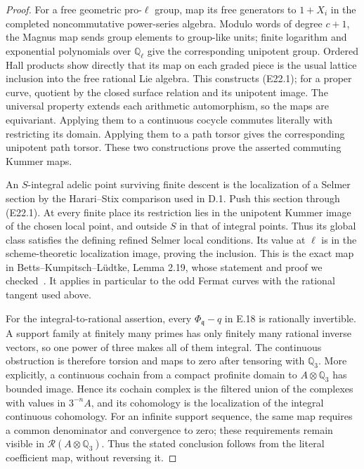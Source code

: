 \documentclass[11pt,oneside]{article}
\begin{document}
\begin{proof}
For a free geometric pro-$\ell$ group, map
its free generators to $1+X_i$ in the
completed noncommutative power-series
algebra. Modulo words of degree $c+1$,
the Magnus map sends group elements to
group-like units; finite logarithm and
exponential polynomials over $\mathbb Q_\ell$
give the corresponding unipotent group.
Ordered Hall products show directly
that its map on each graded piece is
the usual lattice inclusion into the
free rational Lie algebra. This
constructs (E22.1); for a proper curve,
quotient by the closed surface relation
and its unipotent image. The universal
property extends each arithmetic
automorphism, so the maps are equivariant.
Applying them to a continuous cocycle
commutes literally with restricting
its domain. Applying them to a path
torsor gives the corresponding
unipotent path torsor. These two
constructions prove the asserted
commuting Kummer maps.

An $S$-integral adelic point surviving
finite descent is the localization of
a Selmer section by the Harari--Stix
comparison used in D.1. Push this
section through (E22.1). At every finite
place its restriction lies in the
unipotent Kummer image of the chosen
local point, and outside $S$ in that
of integral points. Thus its global
class satisfies the defining refined
Selmer local conditions. Its value
at $\ell$ is in the scheme-theoretic
localization image, proving the
inclusion. This is the exact map
in Betts--Kumpitsch--L\"udtke,
Lemma 2.19, whose statement and proof
we checked~\cite{BettsKumpitschLudtke2026}.
It applies in particular to the odd
Fermat curves with the rational
tangent used above.

For the integral-to-rational assertion,
every $\Phi_{\mathfrak q}-q$ in E.18
is rationally invertible. A support
family at finitely many primes has
only finitely many rational inverse
vectors, so one power of three makes
all of them integral. The continuous
obstruction is therefore torsion and
maps to zero after tensoring with
$\mathbb Q_3$. More explicitly, a
continuous cochain from a compact
profinite domain to $A\otimes\mathbb Q_3$
has bounded image. Hence its cochain
complex is the filtered union of
the complexes with values in $3^{-n}A$,
and its cohomology is the localization
of the integral continuous cohomology.
For an infinite support sequence,
the same map requires a common
denominator and convergence to zero;
these requirements remain visible
in $\mathcal R(A\otimes\mathbb Q_3)$.
Thus the stated conclusion follows
from the literal coefficient map,
without reversing it.


\end{proof}
\end{document}
